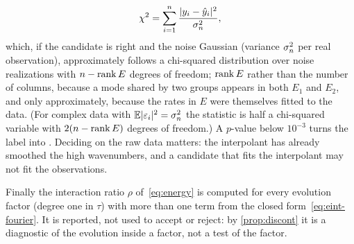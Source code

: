 \[
  \chi^2=\sum_{i=1}^{n}\frac{\lvert y_i-\hat y_i\rvert^2}{\sigma_{n}^2},
\]
which, if the candidate is right and the noise Gaussian (variance $\sigma_{n}^2$ per real observation), approximately follows
a chi-squared distribution over noise realizations with $n-\operatorname{rank} E$ degrees of freedom; $\operatorname{rank} E$ rather than the number of
columns, because a mode shared by two groups appears in both $E_1$ and $E_2$, and only approximately, because the rates in
$E$ were themselves fitted to the data. (For complex data with $\mathbb E\lvert\varepsilon_i\rvert^2=\sigma_{n}^2$ the statistic is half
a chi-squared variable with $2(n-\operatorname{rank} E)$ degrees of freedom.) A $p$-value below $10^{-3}$
turns the label into \MIS. Deciding on the raw data matters:
the interpolant has already smoothed the high wavenumbers, and a candidate that fits the interpolant may
not fit the observations.

Finally the interaction ratio $\rho$ of~\eqref{eq:energy} is computed for every evolution factor (degree one in $\tau$) with more than one
term from the closed form~\eqref{eq:eint-fourier}. It is reported, not used to accept or reject: by
\cref{prop:discont} it is a diagnostic of the evolution inside a factor, not a test of the factor.
